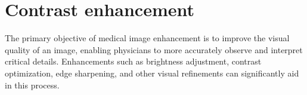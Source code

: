 \chapter{Contrast enhancement}

The primary objective of medical image enhancement is to improve the visual quality of an image, enabling physicians to more accurately observe and interpret critical details. Enhancements such as brightness adjustment, contrast optimization, edge sharpening, and other visual refinements can significantly aid in this process.

